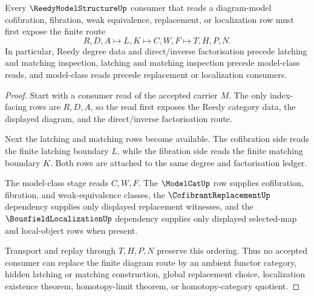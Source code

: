 \begin{theorem}
\label{thm:reedy-model-structure-finite-diagram-route}
Every $\ReedyModelStructureUp$ consumer that reads a diagram-model cofibration, fibration, weak equivalence, replacement, or localization row must first expose the finite route
$$
R,D,A \longmapsto L,K \longmapsto C,W,F \longmapsto T,H,P,N .
$$
In particular, Reedy degree data and direct/inverse factorisation precede latching and matching inspection, latching and matching inspection precede model-class reads, and model-class reads precede replacement or localization consumers.
\end{theorem}
\begin{proof}
Start with a consumer read of the accepted carrier $M$. The only index-facing rows are $R,D,A$, so the read first exposes the Reedy category data, the displayed diagram, and the direct/inverse factorisation route.

Next the latching and matching rows become available. The cofibration side reads the finite latching boundary $L$, while the fibration side reads the finite matching boundary $K$. Both rows are attached to the same degree and factorisation ledger.

The model-class stage reads $C,W,F$. The $\ModelCatUp$ row supplies cofibration, fibration, and weak-equivalence classes, the $\CofibrantReplacementUp$ dependency supplies only displayed replacement witnesses, and the $\BousfieldLocalizationUp$ dependency supplies only displayed selected-map and local-object rows when present.

Transport and replay through $T,H,P,N$ preserve this ordering. Thus no accepted consumer can replace the finite diagram route by an ambient functor category, hidden latching or matching construction, global replacement choice, localization existence theorem, homotopy-limit theorem, or homotopy-category quotient.
\end{proof}


